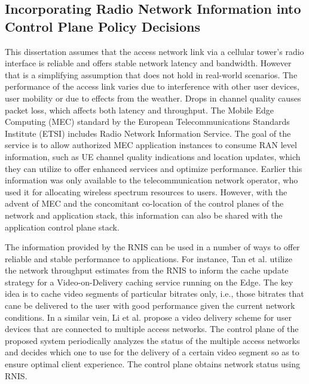 \subsection{Incorporating Radio Network Information into Control Plane Policy Decisions}
This dissertation assumes that the access network link via a cellular tower's radio interface is reliable and offers stable network latency and bandwidth. However that is a simplifying assumption that does not hold in real-world scenarios. The performance of the access link varies due to interference with other user devices, user mobility or due to effects from the weather. Drops in channel quality causes packet loss, which affects both latency and throughput. The Mobile Edge Computing (MEC) standard by the European Telecommunications Standards Institute (ETSI) includes Radio Network Information Service. The goal of the service is to allow authorized MEC application instances to consume RAN level information, such as UE channel quality indications and location updates, which they can utilize to offer enhanced services and optimize performance. Earlier this information was only available to the telecommunication network operator, who used it for allocating wireless spectrum resources to users. However, with the advent of MEC and the concomitant co-location of the control planes of the network and application stack, this information can also be shared with the application control plane stack.
\par The information provided by the RNIS can be used in a number of ways to offer reliable and stable performance to applications. For instance, Tan et al. \cite{tan2018radio} utilize the network throughput estimates from the RNIS to inform the cache update strategy for a Video-on-Delivery caching service running on the Edge. The key idea is to cache video segments of particular bitrates only, i.e., those bitrates that cane be delivered to the user with good performance given the current network conditions. In a similar vein, Li et al. \cite{li2017mobile} propose a video delivery scheme for user devices that are connected to multiple access networks. The control plane of the proposed system periodically analyzes the status of the multiple access networks and decides which one to use for the delivery of a certain video segment so as to ensure optimal client experience. The control plane obtains network status using RNIS. 

